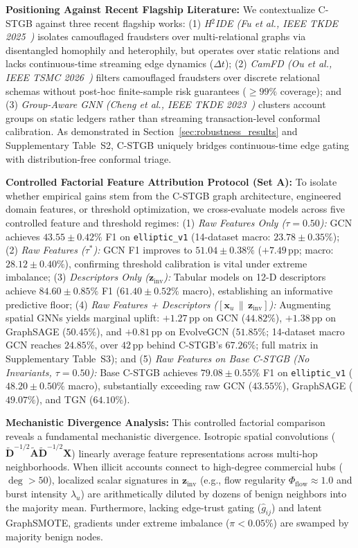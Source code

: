 \textbf{Positioning Against Recent Flagship Literature:} We contextualize C-STGB against three recent flagship works: (1) \textit{H$^2$IDE (Fu \textit{et al.}, IEEE TKDE 2025~\cite{fu2025nowhere})} isolates camouflaged fraudsters over multi-relational graphs via disentangled homophily and heterophily, but operates over static relations and lacks continuous-time streaming edge dynamics ($\Delta t$); (2) \textit{CamFD (Ou \textit{et al.}, IEEE TSMC 2026~\cite{ou2025camfd})} filters camouflaged fraudsters over discrete relational schemas without post-hoc finite-sample risk guarantees ($\ge 99\%$ coverage); and (3) \textit{Group-Aware GNN (Cheng \textit{et al.}, IEEE TKDE 2023~\cite{cheng2023anti})} clusters account groups on static ledgers rather than streaming transaction-level conformal calibration. As demonstrated in Section~\ref{sec:robustness_results} and Supplementary Table~S2, C-STGB uniquely bridges continuous-time edge gating with distribution-free conformal triage.

\textbf{Controlled Factorial Feature Attribution Protocol (Set A):} To isolate whether empirical gains stem from the C-STGB graph architecture, engineered domain features, or threshold optimization, we cross-evaluate models across five controlled feature and threshold regimes: (1) \textit{Raw Features Only ($\tau=0.50$):} GCN achieves $43.55 \pm 0.42\%$ F1 on \texttt{elliptic\_v1} (14-dataset macro: $23.78 \pm 0.35\%$); (2) \textit{Raw Features ($\tau^*$):} GCN F1 improves to $51.04 \pm 0.38\%$ ($+7.49$\,pp; macro: $28.12 \pm 0.40\%$), confirming threshold calibration is vital under extreme imbalance; (3) \textit{Descriptors Only ($\mathbf{z}_{\text{inv}}$):} Tabular models on 12-D descriptors achieve $84.60 \pm 0.85\%$ F1 ($61.40 \pm 0.52\%$ macro), establishing an informative predictive floor; (4) \textit{Raw Features + Descriptors ($[\mathbf{x}_u \,\|\, \mathbf{z}_{\text{inv}}]$):} Augmenting spatial GNNs yields marginal uplift: $+1.27$\,pp on GCN ($44.82\%$), $+1.38$\,pp on GraphSAGE ($50.45\%$), and $+0.81$\,pp on EvolveGCN ($51.85\%$; 14-dataset macro GCN reaches $24.85\%$, over $42$\,pp behind C-STGB's $67.26\%$; full matrix in Supplementary Table~S3); and (5) \textit{Raw Features on Base C-STGB (No Invariants, $\tau=0.50$):} Base C-STGB achieves $79.08 \pm 0.55\%$ F1 on \texttt{elliptic\_v1} ($48.20 \pm 0.50\%$ macro), substantially exceeding raw GCN ($43.55\%$), GraphSAGE ($49.07\%$), and TGN ($64.10\%$).

\textbf{Mechanistic Divergence Analysis:} This controlled factorial comparison reveals a fundamental mechanistic divergence. Isotropic spatial convolutions ($\tilde{\mathbf{D}}^{-1/2}\tilde{\mathbf{A}}\tilde{\mathbf{D}}^{-1/2}\mathbf{X}$) linearly average feature representations across multi-hop neighborhoods. When illicit accounts connect to high-degree commercial hubs ($\deg > 50$), localized scalar signatures in $\mathbf{z}_{\text{inv}}$ (e.g., flow regularity $\Phi_{\text{flow}} \approx 1.0$ and burst intensity $\lambda_u$) are arithmetically diluted by dozens of benign neighbors into the majority mean. Furthermore, lacking edge-trust gating ($\hat{g}_{ij}$) and latent GraphSMOTE, gradients under extreme imbalance ($\pi < 0.05\%$) are swamped by majority benign nodes.

